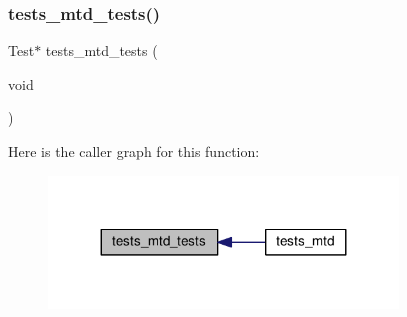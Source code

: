 \subsubsection{\texorpdfstring{tests\+\_\+mtd\+\_\+tests()}{tests\_mtd\_tests()}}
{\footnotesize\ttfamily Test$\ast$ tests\+\_\+mtd\+\_\+tests (\begin{DoxyParamCaption}\item[{void}]{ }\end{DoxyParamCaption})}

Here is the caller graph for this function\+:
\nopagebreak
\begin{figure}[H]
\begin{center}
\leavevmode
\includegraphics[width=263pt]{tests-mtd_8c_a0b45a8d3b915b478bf23efd0717e639a_icgraph}
\end{center}
\end{figure}
